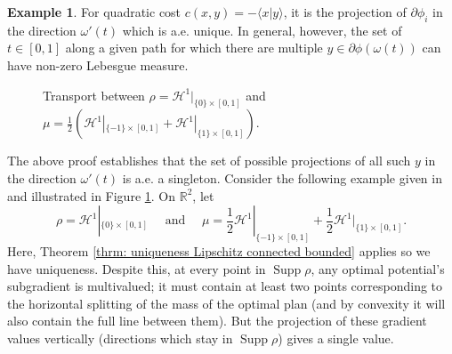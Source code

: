 \documentclass[11pt, oneside, titlepage]{book}
\theoremstyle{plain}
\theoremstyle{definition}
\newtheorem{example}[theorem]{Example}
\newcommand{\R}{\mathbb{R}}
\DeclareMathOperator{\supp}{Supp}
\begin{document}
\begin{example}
For quadratic cost $c(x, y) = - \langle x | y \rangle$, it is the projection of $\partial\phi_i$ in the direction $\omega'(t)$ which is a.e. unique. In general, however, the set of $t \in [0, 1]$ along a given path for which there are multiple $y \in \partial \phi (\omega(t))$ can have non-zero Lebesgue measure. 
\begin{figure}[ht]
        \centering
{}


        \caption{Transport between $\rho = \mathcal{H}^1|_{\{0\} \times [0, 1]}$ and $\mu= \frac{1}{2}(\mathcal{H}^1|_{\{-1\} \times [0, 1]} + \mathcal{H}^1|_{\{1\} \times [0, 1]})$. }
        \label{fig:uniqueness of gradient projection}
\end{figure}
The above proof establishes that the set of possible projections of all such $y$ in the direction $\omega'(t)$ is a.e. a singleton. Consider the following example given in \cite[Section 1.4]{santambrogio2015optimal} and illustrated in Figure \ref{fig:uniqueness of gradient projection}. On $\R^2$, let
    \begin{equation*}
        \rho = \mathcal{H}^1|_{\{0\} \times [0, 1]} \quad \text{ and } \quad \mu = \frac{1}{2}\mathcal{H}^1|_{\{-1\} \times [0, 1]} + \frac{1}{2}\mathcal{H}^1|_{\{1\} \times [0, 1]}.
    \end{equation*}
Here, Theorem \ref{thrm: uniqueness Lipschitz connected bounded} applies so we have uniqueness. Despite this, at every point in $\supp\rho$, any optimal potential's subgradient is multivalued; it must contain at least two points corresponding to the horizontal splitting of the mass of the optimal plan (and by convexity it will also contain the full line between them). But the projection of these gradient values vertically (directions which stay in $\supp \rho$) gives a single value.
\end{example}
\end{document}
